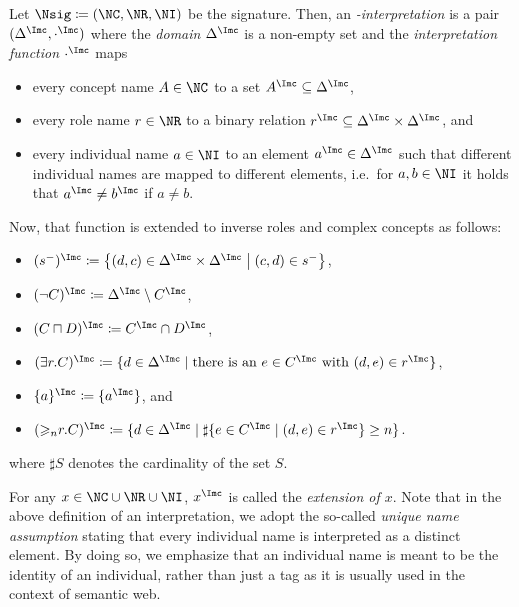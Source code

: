 \begin{definition}
  \label{def:n-interpretation}
  Let $\Nsig\coloneqq(\NC,\NR,\NI)$ be the signature. Then, an \emph{\Nsig-interpretation \I} is a pair
  $(\Delta^{\I}, \cdot^{\I})$ where the \emph{domain} $\Delta^{\I}$ is a non-empty set and
  the \emph{interpretation function} $\cdot^{\I}$ maps
  \begin{itemize}
  \item every concept name $A\in\NC$ to a set $A^{\I}\subseteq\Delta^{\I}$,
  \item every role name $r\in\NR$ to a binary relation
    $r^{\I}\subseteq\Delta^{\I}\times\Delta^{\I}$, and
  \item every individual name $a\in\NI$ to an element $a^{\I}\in\Delta^{\I}$ such that different
    individual names are mapped to different elements, i.e.\ for $a,b\in\NI$ it holds that
    $a^{\I}\neq b^{\I}$ if $a\neq b$.
  \end{itemize}
  Now, that function is extended to inverse roles and complex concepts as follows:
  \begin{itemize}
  \item $(s^{-})^{\I} \coloneqq \left\{(d,c)\in\Delta^{\I}\times\Delta^{\I}\mmid (c,d)\in
      s^{-}\right\}$,
  \item $(\lnot C)^{\I} \coloneqq \Delta^{\I} \setminus C^{\I}$,
  \item $(C \sqcap D)^{\I} \coloneqq C^{\I} \cap D^{\I}$,
  \item $(\exists r.C)^{\I} \coloneqq \{d \in \Delta^\I \mid \text{there is an}\ e \in C^\I \
    \text{with}\ (d,e)\in r^\I\}$,
  \item $\{a\}^{\I} \coloneqq \{a^{\I}\}$, and
  \item $(\atleast{n}{r}{C})^{\I} \coloneqq \{d \in \Delta^{\I} \mid \sharp\{e\in C^{\I}\mid (d,e)\in r^{\I}\}\ge n\}$.
  \end{itemize}
  where $\sharp S$ denotes the cardinality of the set $S$.
\end{definition}

\noindent
For any $x\in\NC\cup\NR\cup\NI$, $x^{\I}$ is called the \emph{extension of $x$}.  Note that in the
above definition of an interpretation, we adopt the so-called \emph{unique name assumption} stating
that every individual name is interpreted as a distinct element. By doing so, we emphasize that an
individual name is meant to be the identity of an individual, rather than just a tag as it is
usually used in the context of semantic web.

